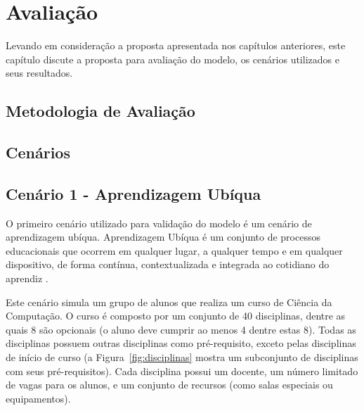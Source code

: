 

\chapter{Avaliação}
\label{ch:avaliacao}

Levando em consideração a proposta apresentada nos capítulos anteriores, este capítulo discute a proposta para avaliação do modelo, os cenários utilizados e seus resultados.


\section{Metodologia de Avaliação}
\label{sec:metod_avaliacao}


\section{Cenários}
\label{sec:cenarios}


\section{Cenário 1 - Aprendizagem Ubíqua}
\label{sec:cenario1}

O primeiro cenário utilizado para validação do modelo é um cenário de aprendizagem ubíqua. Aprendizagem Ubíqua é um conjunto de processos educacionais que ocorrem em qualquer lugar, a qualquer tempo e em qualquer dispositivo, de forma contínua, contextualizada e integrada ao cotidiano do aprendiz \cite{barbosa11}.

Este cenário simula um grupo de alunos que realiza um curso de Ciência da Computação. O curso é composto por um conjunto de 40 disciplinas, dentre as quais 8 são opcionais (o aluno deve cumprir ao menos 4 dentre estas 8). Todas as disciplinas possuem outras disciplinas como pré-requisito, exceto pelas disciplinas de início de curso (a Figura~\ref{fig:disciplinas} mostra um subconjunto de disciplinas com seus pré-requisitos). Cada disciplina possui um docente, um número limitado de vagas para os alunos, e um conjunto de recursos (como salas especiais ou equipamentos).

